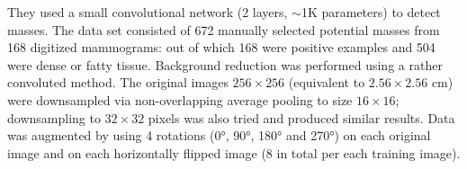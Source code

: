 \begin{comment}
- Experiment with single input image:
	single hidden layer network with variable feature maps and kernel size.
	Best results with kernel size 10 for 16 and 20 for 32.
	small grid search(needed to test more values).
	0.83 AUC
- GLDS texture features: contrast, angular second moment, enlropy and mean. Calculated at different subregions of the original 256 by 256 pixel image (it produces a 16 by 16 image).
- Experiment with GLDS plus pool-averaged image: 
	one hidden layer (3 feature maps, 10by 10 filter)
	16 by 16 raw input and one of the four possible GLDS
	good results already 0.86s 0.85
SGLD features: correlation, entropy, and difference entropy 
- Experiment with SGLD plus pool-averaged input:
	one hidden layer (3 feature maps, 10 by 10 filter)
	16 by 16 plus one
	NOt so good 0.84 AUC
- Good one: one of each plus index 
	one hidden layer
	varying kernel size and number of feature maps
	3 input images: pool-averaged, mean GLDS, SGLD correlation
- why not try imputing all possible GLDS+ all SLDS features+ raw  (8 feature maps) or deeper network? Probably because of no comp power
- give more info helps the AUC, maybe the improvement comes from the info lost by subsampling and the shallowness of the network, a deeper network with million parameters (and bigger input) will be able to learn the GLDS or SLDS features.
- texture images improve classification
- conv architecture not as important as texture images. (more image data/info)
- also points the need for bigger networks and the suboptimality of the hyperparamteer search (not all reasonable combination tried)
- no difference on 16 \times 16 vs 32 \times 32 (not sure about these because they were not one tested on the exact same architecture).
\end{comment}
They used a small convolutional network (2 layers, $\sim$1K parameters) to detect masses.
The data set consisted of 672 manually selected potential masses from 168 digitized mammograms: out of which 168 were positive examples and 504 were dense or fatty tissue. Background reduction was performed using a rather convoluted method. The original images $256 \times 256$ (equivalent to $2.56 \times 2.56$ cm) were downsampled via non-overlapping average pooling to size $16\times 16$; downsampling to $32 \times 32$ pixels was also tried and produced similar results. Data was augmented by using 4 rotations (0°, 90°, 180° and 270°) on each original image and on each horizontally flipped image (8 in total per each training image).
